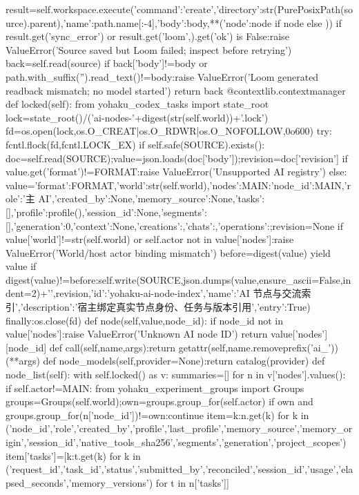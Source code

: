    result=self.workspace.execute({'command':'create','directory':str(PurePosixPath(source).parent),'name':path.name[:-4],'body':body,**({'node':node} if node else {})})
  if result.get('sync_error') or result.get('loom',{}).get('ok') is False:raise ValueError('Source saved but Loom failed; inspect before retrying')
  back=self.read(source)
  if back['body']!=body or path.with_suffix('').read_text()!=body:raise ValueError('Loom generated readback mismatch; no model started')
  return back
 @contextlib.contextmanager
 def locked(self):
  from yohaku_codex_tasks import state_root
  lock=state_root()/('ai-nodes-'+digest(str(self.world))+'.lock')
  fd=os.open(lock,os.O_CREAT|os.O_RDWR|os.O_NOFOLLOW,0o600)
  try:
   fcntl.flock(fd,fcntl.LOCK_EX)
   if self.safe(SOURCE).exists():
    doc=self.read(SOURCE);value=json.loads(doc['body']);revision=doc['revision']
    if value.get('format')!=FORMAT:raise ValueError('Unsupported AI registry')
   else:
    value={'format':FORMAT,'world':str(self.world),'nodes':{MAIN:{'node_id':MAIN,'role':'主 AI','created_by':None,'memory_source':None,'tasks':[],'profile':profile(),'session_id':None,'segments':[],'generation':0,'context':None}},'creations':{},'chats':{},'operations':{}};revision=None
   if value['world']!=str(self.world) or self.actor not in value['nodes']:raise ValueError('World/host actor binding mismatch')
   before=digest(value)
   yield value
   if digest(value)!=before:self.write(SOURCE,json.dumps(value,ensure_ascii=False,indent=2)+'\n',revision,{'id':'yohaku-ai-node-index','name':'AI 节点与交流索引','description':'宿主绑定真实节点身份、任务与版本引用','entry':True})
  finally:os.close(fd)
 def node(self,value,node_id):
  if node_id not in value['nodes']:raise ValueError('Unknown AI node ID')
  return value['nodes'][node_id]
 def call(self,name,args):return getattr(self,name.removeprefix('ai_'))(**args)
 def node_models(self,provider=None):return catalog(provider)
 def node_list(self):
  with self.locked() as v:
   summaries=[]
   for n in v['nodes'].values():
    if self.actor!=MAIN:
     from yohaku_experiment_groups import Groups
     groups=Groups(self.world);own=groups.group_for(self.actor)
     if own and groups.group_for(n['node_id'])!=own:continue
    item={k:n.get(k) for k in ('node_id','role','created_by','profile','last_profile','memory_source','memory_origin','session_id','native_tools_sha256','segments','generation','project_scopes')}
    item['tasks']=[{k:t.get(k) for k in ('request_id','task_id','status','submitted_by','reconciled','session_id','usage','elapsed_seconds','memory_versions')} for t in n['tasks']]
